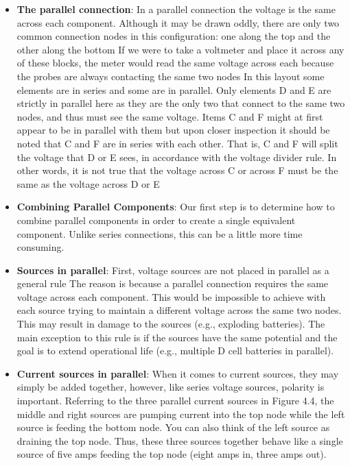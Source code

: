 \documentclass{report}
\begin{document}
    \pagebreak 
    \begin{itemize}
        \item \textbf{The parallel connection}:  In a parallel connection the voltage is the same across each component. 
            \bigbreak \noindent 
            \bigbreak \noindent 
            Although it may be drawn oddly, there are only two common connection nodes in this configuration: one along the top and the other along the bottom
            \bigbreak \noindent 
            If we were to take a voltmeter and place it across any of these blocks, the meter would read the same voltage across each because the probes are always contacting the same two nodes
            \bigbreak \noindent 
            \bigbreak \noindent 
            In this layout some elements are in series and some are in parallel. Only elements D and E are strictly in parallel here as they are the only two that connect to the same two nodes, and thus must see the same voltage.
            \bigbreak \noindent 
            Items C and F might at first appear to be in parallel with them but upon closer inspection it should be noted that C and F are in series with each other. That is, C and F will split the voltage that D or E sees, in accordance with the voltage divider rule. In other words, it is not true that the voltage across C or across F must be the same as the voltage across D or E
        \item \textbf{Combining Parallel Components}: Our first step is to determine how to combine parallel components in order to create a single equivalent component. Unlike series connections, this can be a little more time consuming.
        \item \textbf{Sources in parallel}: First, voltage sources are not placed in parallel as a general rule
            \bigbreak \noindent 
            \bigbreak \noindent 
            The reason is because a parallel connection requires the same voltage across each component. This would be impossible to achieve with each source trying to maintain a different voltage across the same two nodes. This may result in damage to the sources (e.g., exploding batteries). The main exception to this rule is if the sources have the same potential and the goal is to extend operational life (e.g., multiple D cell batteries in parallel).
        \item \textbf{Current sources in parallel}: When it comes to current sources, they may simply be added together, however, like series voltage sources, polarity is important. Referring to the three parallel current sources in Figure 4.4, the middle and right sources are pumping current into the top node while the left source is feeding the bottom node. You can also think of the left source as draining the top node. Thus, these three sources together behave like a single source of five amps feeding the top node (eight amps in, three amps out). 

\end{itemize}
\end{document}
